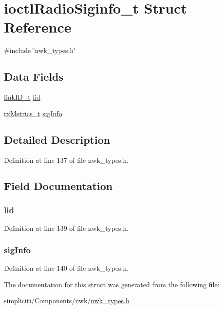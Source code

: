 \hypertarget{structioctlRadioSiginfo__t}{\section{ioctl\-Radio\-Siginfo\-\_\-t \-Struct \-Reference}
\label{structioctlRadioSiginfo__t}
}


{\ttfamily \#include \char`\"{}nwk\-\_\-types.\-h\char`\"{}}

\subsection*{\-Data \-Fields}
\begin{DoxyCompactItemize}
\item 
\hyperlink{nwk__types_8h_a542d45d12faba7ae8fd0c989ef2c8528}{link\-I\-D\-\_\-t} \hyperlink{structioctlRadioSiginfo__t_ac37c121af45cbf458e3af68c470b5531}{lid}
\item 
\hyperlink{structrxMetrics__t}{rx\-Metrics\-\_\-t} \hyperlink{structioctlRadioSiginfo__t_a87903a190e749b4aa6e73a2aa5d18ff1}{sig\-Info}
\end{DoxyCompactItemize}


\subsection{\-Detailed \-Description}


\-Definition at line 137 of file nwk\-\_\-types.\-h.



\subsection{\-Field \-Documentation}
\hypertarget{structioctlRadioSiginfo__t_ac37c121af45cbf458e3af68c470b5531}{
\subsubsection[{lid}]{ {\bf lid}}}\label{structioctlRadioSiginfo__t_ac37c121af45cbf458e3af68c470b5531}


\-Definition at line 139 of file nwk\-\_\-types.\-h.

\hypertarget{structioctlRadioSiginfo__t_a87903a190e749b4aa6e73a2aa5d18ff1}{
\subsubsection[{sig\-Info}]{ {\bf sig\-Info}}}\label{structioctlRadioSiginfo__t_a87903a190e749b4aa6e73a2aa5d18ff1}


\-Definition at line 140 of file nwk\-\_\-types.\-h.



\-The documentation for this struct was generated from the following file\-:\begin{DoxyCompactItemize}
\item 
simpliciti/\-Components/nwk/\hyperlink{nwk__types_8h}{nwk\-\_\-types.\-h}\end{DoxyCompactItemize}
